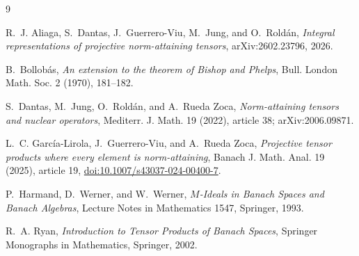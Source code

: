 \documentclass[11pt]{article}
\theoremstyle{definition}
\theoremstyle{remark}
\begin{document}
\begin{thebibliography}{9}

R.~J. Aliaga, S.~Dantas, J.~Guerrero-Viu, M.~Jung, and O.~Rold\'an,
\emph{Integral representations of projective norm-attaining tensors},
arXiv:2602.23796, 2026.

B.~Bollob\'as,
\emph{An extension to the theorem of Bishop and Phelps},
Bull. London Math. Soc. 2 (1970), 181--182.

S.~Dantas, M.~Jung, O.~Rold\'an, and A.~Rueda Zoca,
\emph{Norm-attaining tensors and nuclear operators},
Mediterr. J. Math. 19 (2022), article 38; arXiv:2006.09871.

L.~C. Garc\'ia-Lirola, J.~Guerrero-Viu, and A.~Rueda Zoca,
\emph{Projective tensor products where every element is norm-attaining},
Banach J. Math. Anal. 19 (2025), article 19,
\href{https://doi.org/10.1007/s43037-024-00400-7}{doi:10.1007/s43037-024-00400-7}.

P.~Harmand, D.~Werner, and W.~Werner,
\emph{$M$-Ideals in Banach Spaces and Banach Algebras},
Lecture Notes in Mathematics 1547, Springer, 1993.

R.~A. Ryan,
\emph{Introduction to Tensor Products of Banach Spaces},
Springer Monographs in Mathematics, Springer, 2002.

\end{thebibliography}
\end{document}
